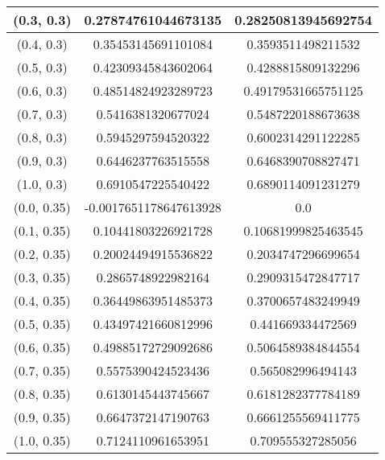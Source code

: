 \begin{table}[H]
\begin{tabular}{|c|c|c|}
\hline
(0.3, 0.3) & 0.27874761044673135 & 0.28250813945692754 \\
\hline
(0.4, 0.3) & 0.35453145691101084 & 0.3593511498211532 \\
\hline
(0.5, 0.3) & 0.42309345843602064 & 0.4288815809132296 \\
\hline
(0.6, 0.3) & 0.48514824923289723 & 0.49179531665751125 \\
\hline
(0.7, 0.3) & 0.5416381320677024 & 0.5487220188673638 \\
\hline
(0.8, 0.3) & 0.5945297594520322 & 0.6002314291122285 \\
\hline
(0.9, 0.3) & 0.6446237763515558 & 0.6468390708827471 \\
\hline
(1.0, 0.3) & 0.6910547225540422 & 0.6890114091231279 \\
\hline
\hline
(0.0, 0.35) & -0.0017651178647613928 & 0.0 \\
\hline
(0.1, 0.35) & 0.10441803226921728 & 0.10681999825463545 \\
\hline
(0.2, 0.35) & 0.20024494915536822 & 0.2034747296699654 \\
\hline
(0.3, 0.35) & 0.2865748922982164 & 0.2909315472847717 \\
\hline
(0.4, 0.35) & 0.36449863951485373 & 0.3700657483249949 \\
\hline
(0.5, 0.35) & 0.43497421660812996 & 0.441669334472569 \\
\hline
(0.6, 0.35) & 0.49885172729092686 & 0.5064589384844554 \\
\hline
(0.7, 0.35) & 0.5575390424523436 & 0.565082996494143 \\
\hline
(0.8, 0.35) & 0.6130145443745667 & 0.6181282377784189 \\
\hline
(0.9, 0.35) & 0.6647372147190763 & 0.6661255569411775 \\
\hline
(1.0, 0.35) & 0.7124110961653951 & 0.709555327285056 \\
\hline
\end{tabular}
\end{table}
